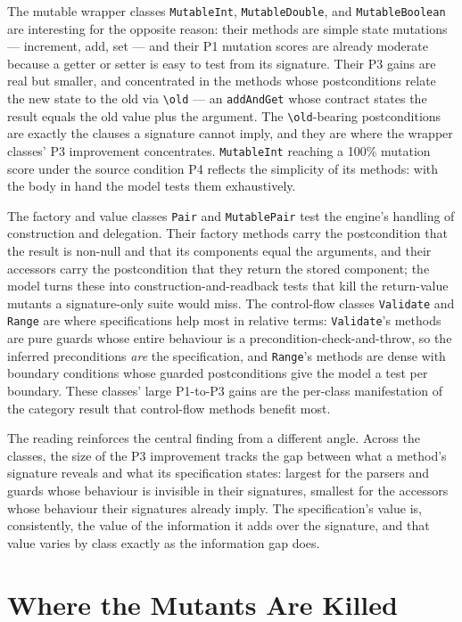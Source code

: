 The mutable wrapper classes \texttt{MutableInt}, \texttt{MutableDouble}, and
\texttt{MutableBoolean} are interesting for the opposite reason: their methods are
simple state mutations --- increment, add, set --- and their P1 mutation scores
are already moderate because a getter or setter is easy to test from its signature.
Their P3 gains are real but smaller, and concentrated in the methods whose
postconditions relate the new state to the old via \texttt{\textbackslash old}
--- an \texttt{addAndGet} whose contract states the result equals the old value
plus the argument. The \texttt{\textbackslash old}-bearing postconditions are
exactly the clauses a signature cannot imply, and they are where the wrapper
classes' P3 improvement concentrates. \texttt{MutableInt} reaching a 100\%
mutation score under the source condition P4 reflects the simplicity of its
methods: with the body in hand the model tests them exhaustively.

The factory and value classes \texttt{Pair} and \texttt{MutablePair} test the
engine's handling of construction and delegation. Their factory methods carry the
postcondition that the result is non-null and that its components equal the
arguments, and their accessors carry the postcondition that they return the
stored component; the model turns these into construction-and-readback tests that
kill the return-value mutants a signature-only suite would miss. The control-flow
classes \texttt{Validate} and \texttt{Range} are where specifications help most in
relative terms: \texttt{Validate}'s methods are pure guards whose entire behaviour
is a precondition-check-and-throw, so the inferred preconditions \emph{are} the
specification, and \texttt{Range}'s methods are dense with boundary conditions
whose guarded postconditions give the model a test per boundary. These classes'
large P1-to-P3 gains are the per-class manifestation of the category result that
control-flow methods benefit most.

The reading reinforces the central finding from a different angle. Across the
classes, the size of the P3 improvement tracks the gap between what a method's
signature reveals and what its specification states: largest for the parsers and
guards whose behaviour is invisible in their signatures, smallest for the
accessors whose behaviour their signatures already imply. The specification's
value is, consistently, the value of the information it adds over the signature,
and that value varies by class exactly as the information gap does.

\section{Where the Mutants Are Killed}
\label{sec:tg-operators}

